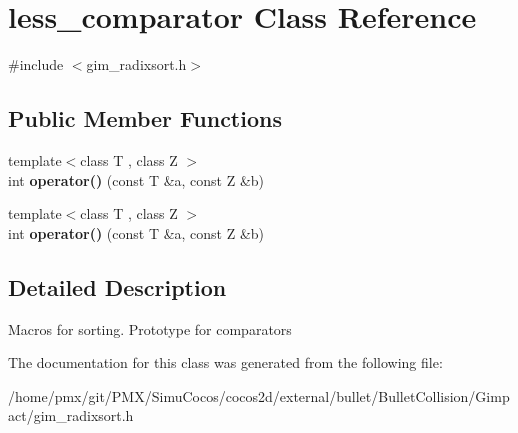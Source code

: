 \hypertarget{classless__comparator}{}\section{less\+\_\+comparator Class Reference}
\label{classless__comparator}


{\ttfamily \#include $<$gim\+\_\+radixsort.\+h$>$}

\subsection*{Public Member Functions}
\begin{DoxyCompactItemize}
\item 
\mbox{\label{classless__comparator_a77c7b11d72818c9d1219b1a5ef615e60}} 
{\footnotesize template$<$class T , class Z $>$ }\\int {\bfseries operator()} (const T \&a, const Z \&b)
\item 
\mbox{\label{classless__comparator_a77c7b11d72818c9d1219b1a5ef615e60}} 
{\footnotesize template$<$class T , class Z $>$ }\\int {\bfseries operator()} (const T \&a, const Z \&b)
\end{DoxyCompactItemize}


\subsection{Detailed Description}
Macros for sorting. Prototype for comparators 

The documentation for this class was generated from the following file\+:\begin{DoxyCompactItemize}
\item 
/home/pmx/git/\+P\+M\+X/\+Simu\+Cocos/cocos2d/external/bullet/\+Bullet\+Collision/\+Gimpact/gim\+\_\+radixsort.\+h\end{DoxyCompactItemize}
